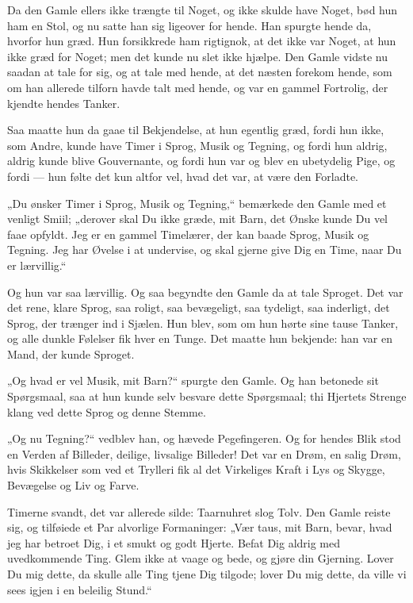 \documentclass[12pt,a4paper]{book}
\newcommand{\apage}[1]{\marginnote{\footnotesize\textit{[#1]}}}
\begin{document}
Da den Gamle ellers ikke trængte til Noget, og ikke skulde have
Noget, bød hun ham en Stol, og nu satte han sig ligeover for hende.
Han spurgte hende da, hvorfor hun græd. Hun forsikkrede ham
rigtignok, at det ikke var Noget, at hun ikke græd for Noget; men
det kunde nu slet ikke hjælpe. Den Gamle vidste nu saadan at tale
for sig, og at tale med hende, at det næsten forekom hende, som om
han allerede tilforn havde talt med hende, og var en gammel
Fortrolig, der kjendte hendes Tanker.

Saa maatte hun da gaae til Bekjendelse, at hun egentlig græd, fordi
hun ikke, som Andre, kunde have Timer i Sprog, Musik og Tegning, og
fordi hun aldrig, aldrig kunde blive Gouvernante, og fordi hun var
og blev en ubetydelig Pige, og fordi --- hun følte det kun altfor
vel, hvad det var, at være den Forladte.

„Du ønsker Timer i Sprog, Musik og Tegning,“ bemærkede den Gamle
med et venligt Smiil; „derover skal Du ikke græde, mit Barn, det
Ønske kunde Du vel faae opfyldt. Jeg er en gammel Timelærer, der
kan baade Sprog, Musik og Tegning. Jeg har Øvelse i at undervise,
og skal gjerne give Dig en Time, naar Du er \apage{88} lærvillig.“

Og hun var saa lærvillig. Og saa begyndte den Gamle da at tale
Sproget. Det var det rene, klare Sprog, saa roligt, saa
bevægeligt, saa tydeligt, saa inderligt, det Sprog, der trænger ind
i Sjælen. Hun blev, som om hun hørte sine tause Tanker, og alle
dunkle Følelser fik hver en Tunge. Det maatte hun bekjende: han var
en Mand, der kunde Sproget.

„Og hvad er vel Musik, mit Barn?“ spurgte den Gamle. Og han
betonede sit Spørgsmaal, saa at hun kunde selv besvare dette
Spørgsmaal; thi Hjertets Strenge klang ved dette Sprog og denne
Stemme.

„Og nu Tegning?“ vedblev han, og hævede Pegefingeren. Og for hendes
Blik stod en Verden af Billeder, deilige, livsalige Billeder! Det
var en Drøm, en salig Drøm, hvis Skikkelser som ved et Trylleri fik
al det Virkeliges Kraft i Lys og Skygge, Bevægelse og Liv og Farve.

Timerne svandt, det var allerede silde: Taarnuhret slog Tolv. Den
Gamle reiste sig, og tilføiede et Par alvorlige Formaninger: „Vær
taus, mit Barn, bevar, hvad jeg har betroet Dig, i et smukt og godt
Hjerte. Befat Dig aldrig med uvedkommende Ting. Glem ikke at vaage
og bede, og gjøre din Gjerning. Lover Du mig dette, da skulle alle
Ting tjene Dig tilgode; lover Du mig dette, da ville vi sees igjen
i en beleilig Stund.“
\end{document}
